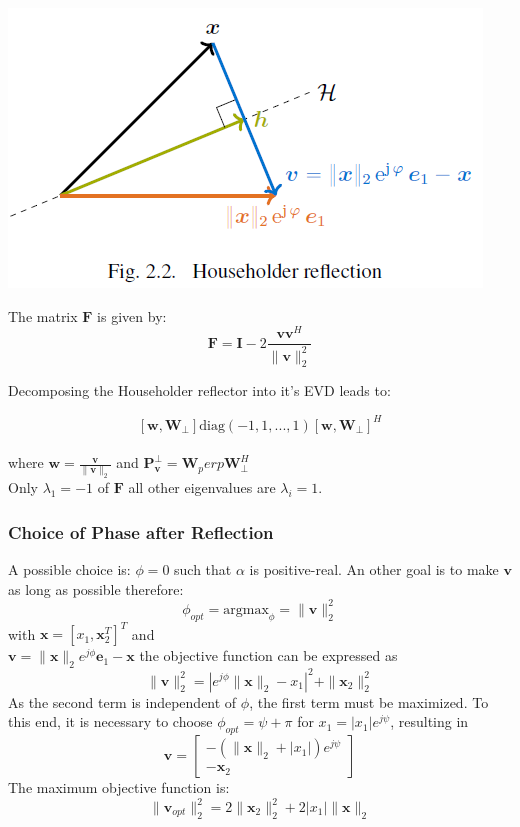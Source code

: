 \documentclass[english]{latex4ei/latex4ei_sheet}
\begin{document}
\begin{sectionbox}
\includegraphics[width=\textwidth]{img/householder.png}

The matrix $\mathbf{F}$ is given by:
$$\mathbf{F} = \mathbf{I} - 2\frac{\mathbf{v}\mathbf{v}^H}{\parallel\mathbf{v}\parallel_2^2}$$

Decomposing the Householder reflector into it's EVD leads to:

$$[\mathbf{w}, \mathbf{W}_\perp]\text{diag}(-1,1,...,1)[\mathbf{w},\mathbf{W}_\perp]^H$$\\
 
where $\mathbf{w} = \frac{\mathbf{v}}{\parallel \mathbf{v}\parallel_2}$ and $\mathbf{P}_\mathbf{v}^\perp = \mathbf{W}_perp\mathbf{W}_\perp^H$\\
Only $\lambda_1=-1$ of $\mathbf{F}$ all other eigenvalues are $\lambda_i=1$.
\end{sectionbox}

\begin{sectionbox}
\subsubsection{Choice of Phase after Reflection}

A possible choice is: $\phi=0$ such that $\alpha$ is positive-real.
An other goal is to make $\mathbf{v}$ as long as possible therefore:
$$\phi_{opt} = \text{argmax}_{\phi} = \parallel \mathbf{v}\parallel_2^2$$
with $\mathbf{x} = [x_1, \mathbf{x}_2^T]^T$ and \\
$\mathbf{v} = \parallel \mathbf{x}\parallel_2 e^{j\phi}\mathbf{e}_1 - \mathbf{x}$ the objective function can be expressed as
$$\parallel \mathbf{v} \parallel_2^2 = |e^{j\phi}\parallel\mathbf{x}\parallel_2 - x_1|^2 + \parallel \mathbf{x}_2 \parallel_2^2$$
As the second term is independent of $\phi$, the first term must be maximized. To this end, it is necessary to choose $\phi_{opt}=\psi+\pi$ for $x_1 = |x_1|e^{j\psi}$, resulting in
$$\mathbf{v} = \begin{bmatrix}
	-(\parallel\mathbf{x}\parallel_2 + |x_1|)e^{j\psi}\\
	-\mathbf{x}_2
\end{bmatrix}$$
The maximum objective function is:
$$\parallel\mathbf{v}_{opt}\parallel_2^2 = 2\parallel\mathbf{x}_2\parallel_2^2 + 2|x_1|\parallel\mathbf{x}\parallel_2$$

\end{sectionbox}
\end{document}
